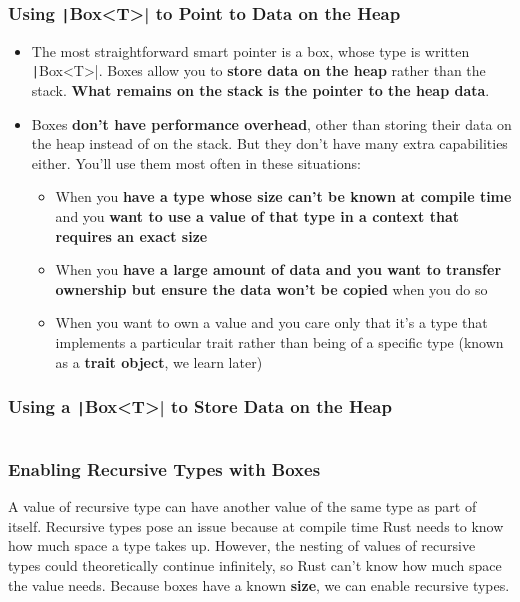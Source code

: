 \documentclass{beamer}
\begin{document}
\begin{frame}[fragile]
	\frametitle{Using \texttt|Box<T>| to Point to Data on the Heap}
	\begin{itemize}
		\item The most straightforward smart pointer is a box, whose type is written \texttt|Box<T>|. Boxes allow you to \textbf{store data on the heap} rather than the stack. \textbf{What remains on the stack is the pointer to the heap data}.
		\item 	Boxes \textbf{don’t have performance overhead}, other than storing their data on the heap instead of on the stack. But they don’t have many extra capabilities either. You’ll use them most often in these situations:
			\begin{itemize}
			\item When you \textbf{have a type whose size can’t be known at compile time} and you \textbf{want to use a value of that type in a context that requires an exact size}
			\item 	When you \textbf{have a large amount of data and you want to transfer ownership but ensure the data won’t be copied} when you do so
			\item 	When you want to own a value and you care only that it’s a type that implements a particular trait rather than being of a specific type (known as a \textbf{trait object}, we learn later)
		\end{itemize}
	\end{itemize}

\end{frame} 


\begin{frame}[fragile]
	\frametitle{Using a \texttt|Box<T>| to Store Data on the Heap}
	\inputminted{rust}{./code/smart1.rs}
\end{frame} 



\begin{frame}[fragile]
	\frametitle{Enabling Recursive Types with Boxes}
	A value of recursive type can have another value of the same type as part of itself. Recursive types pose an issue because at compile time Rust needs to know how much space a type takes up. However, the nesting of values of recursive types could theoretically continue infinitely, so Rust can’t know how much space the value needs. Because boxes have a known \textbf{size}, we can enable recursive types.
	
	\inputminted[fontsize=\scriptsize]{rust}{./code/smart2.rs}
\end{frame} 
\end{document}
